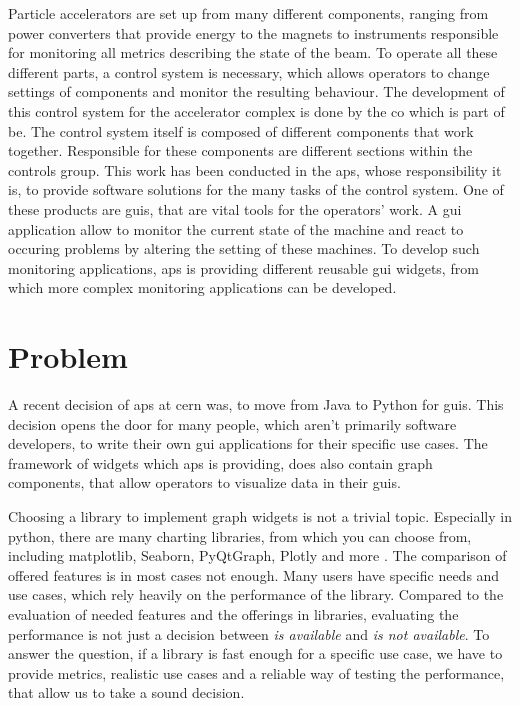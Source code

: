 Particle accelerators are set up from many different components, ranging from power converters that provide energy to the magnets to instruments responsible for monitoring all metrics describing the state of the beam. To operate all these different parts, a control system is necessary, which allows operators to change settings of components and monitor the resulting behaviour. The development of this control system for the accelerator complex is done by the \gls{co} which is part of \gls{be}. \cite{ControlSystemBible}
The control system itself is composed of different components that work together. Responsible for these components are different sections within the controls group.
This work has been conducted in the \gls{aps}, whose responsibility it is, to provide software solutions for the many tasks of the control system. One of these products are \gls{guis}, that are vital tools for the operators' work.
A \gls{gui} application allow to monitor the current state of the machine and react to occuring problems by altering the setting of these machines. To develop such monitoring applications, \gls{aps} is providing different reusable \gls{gui} widgets, from which more complex monitoring applications can be developed.

\section{Problem}
\label{sec:Introduction:problem}

A recent decision of \gls{aps} at \gls{cern} was, to move from Java to Python for \gls{guis}. This decision opens the door for many people, which aren't primarily software developers, to write their own \gls{gui} applications for their specific use cases. The framework of widgets which \gls{aps} is providing, does also contain graph components, that allow operators to visualize data in their \gls{guis}.

Choosing a library to implement graph widgets is not a trivial topic. Especially in python, there are many charting libraries, from which you can choose from, including matplotlib, Seaborn, PyQtGraph, Plotly and more \cite{PyDataVisLibs}. The comparison of offered features is in most cases not enough. Many users have specific needs and use cases, which rely heavily on the performance of the library. Compared to the evaluation of needed features and the offerings in libraries, evaluating the performance is not just a decision between \emph{is available} and \emph{is not available}. To answer the question, if a library is fast enough for a specific use case, we have to provide metrics, realistic use cases and a reliable way of testing the performance, that allow us to take a sound decision.

